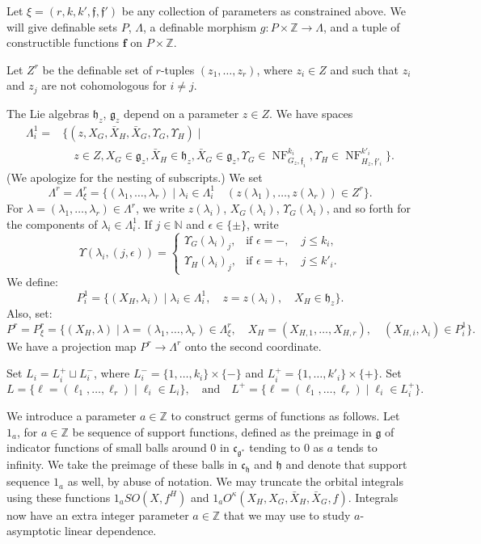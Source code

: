 \documentclass[12pt]{amsart}
\newcommand{\op}[1]{\operatorname{#1}}
\newcommand{\ring}[1]{{\mathbb #1}}
\def\NF{\op{NF}}
\def\Y{\Upsilon}
\def\s{{\mathfrak{f}}}
\def\bf{\mathbf f}
\newcommand{\fg}{\mathfrak{g}}
\newcommand{\fc}{\mathfrak{c}}
\newcommand{\fh}{\mathfrak{h}}
\theoremstyle{plain}
\theoremstyle{definition}
\begin{document}
Let $\xi=(r,k,k',\s,\s')$ be any collection of parameters as constrained above.  
We will give definable sets $P$, $\Lambda$, a definable
morphism $g:P\times\ring{Z}\to \Lambda$, and a tuple of
constructible functions $\bf$ on $P\times\ring{Z}$.

Let $Z^r$ be the definable
set of $r$-tuples $(z_1,\ldots,z_r)$, where $z_i \in Z$ and such
that $z_i$ and $z_j$ are not cohomologous for $i\ne j$.  

The Lie algebras $\fh_z$, $\fg_z$ depend on a parameter $z\in Z$.
We have spaces
\begin{align*}
\Lambda^1_i = &\{(z,X_G,\bar X_H,\bar X_G,\Y_G,\Y_H) \mid \\
     &\quad z\in Z, X_G\in \fg_z,
\bar X_H \in \fh_z, \bar X_G\in \fg_z, \Y_G\in \NF^{k_i}_{G_z,\s_i}, \Y_H\in \NF^{k'_i}_{H_z,\s'_i}\}.
\end{align*}
(We apologize for the nesting of subscripts.)
We set
\[
\Lambda^r = \Lambda^r_\xi = \{(\lambda_1,\ldots,\lambda_r) \mid \lambda_i \in \Lambda^1_i\quad
  (z(\lambda_1),\ldots,z(\lambda_r))\in Z^r \}.
\]
For $\lambda=(\lambda_1,\ldots,\lambda_r)\in \Lambda^r$, we write
$z(\lambda_i)$, $X_G(\lambda_i)$, $\Y_G(\lambda_i)$, and so forth for the components of $\lambda_i\in\Lambda^1_i$.  
If $j\in\ring{N}$ and $\epsilon\in\{\pm\}$, write
\[
\Y(\lambda_i,(j,\epsilon)) = 
\begin{cases}
\Y_G(\lambda_i)_j,&\text{if }\epsilon= -,\quad j\le k_i,\\
\Y_H(\lambda_i)_j,&\text{if }\epsilon= +,\quad j\le k'_i.
\end{cases}
\]
We
define:
\[
P^1_i = \{(X_H,\lambda_i) \mid \lambda_i\in \Lambda^1_i,
\quad z = z(\lambda_i),\quad X_H \in \fh_z\}.
\]
Also, set:
\[
P^r = P^r_\xi = \{(X_H,\lambda) \mid \lambda = (\lambda_1,\ldots,\lambda_r)\in \Lambda^r_\xi,\quad
  X_H = (X_{H,1},\ldots,X_{H,r}), \quad (X_{H,i},\lambda_i) \in P^1_i\}.
\]
We have a projection map $P^r\to \Lambda^r$ onto the second coordinate.

Set
$L_i = L^+_i\sqcup L^-_i$, where $L^-_i =
\{1,\ldots,k_i\}\times\{-\}$ and $L^+_i =
\{1,\ldots,k'_i\}\times\{+\}$.
Set
\[
L = \{\ell = (\ell_1,\ldots,\ell_r)\mid \ell_i\in L_i\},\quad\text{and}\quad
L^+ = \{\ell = (\ell_1,\ldots,\ell_r)\mid \ell_i\in L^+_i\}.
\]

We introduce a parameter $a\in\ring{Z}$ to construct germs of
functions as follows.  Let $1_a$, for $a\in\ring{Z}$ be sequence of
support functions, defined as the preimage in $\fg$ of indicator
functions of small balls around $0$ in $\fc_{\fg^*}$ tending to $0$ as
$a$ tends to infinity.  We take the preimage of these balls in
$\fc_{\fh}$ and $\fh$ and denote that support sequence $1_a$ as well,
by abuse of notation.  We may truncate the orbital integrals using
these functions $1_a SO(X,f^H)$ and $1_a O^\kappa(X_H,X_G,\bar
X_H,\bar X_G,f)$.  Integrals now have an extra integer parameter
$a\in\ring{Z}$ that we may use to study $a$-asymptotic linear
dependence.  
\end{document}
